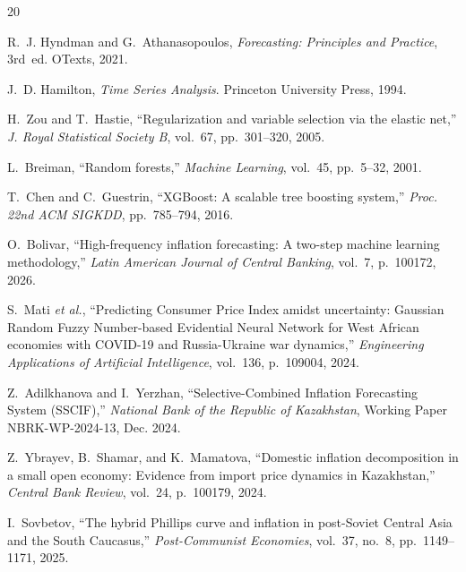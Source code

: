 \documentclass[14pt, a4paper]{extarticle}
\begin{document}
\newpage
\renewcommand{\refname}{REFERENCES}
\begin{thebibliography}{20}

R.~J. Hyndman and G.~Athanasopoulos,
\textit{Forecasting: Principles and Practice}, 3rd~ed.
OTexts, 2021.

J.~D. Hamilton,
\textit{Time Series Analysis}.
Princeton University Press, 1994.

H.~Zou and T.~Hastie,
``Regularization and variable selection via the elastic net,''
\textit{J. Royal Statistical Society B}, vol.~67, pp.~301--320, 2005.

L.~Breiman,
``Random forests,''
\textit{Machine Learning}, vol.~45, pp.~5--32, 2001.

T.~Chen and C.~Guestrin,
``XGBoost: A scalable tree boosting system,''
\textit{Proc. 22nd ACM SIGKDD}, pp.~785--794, 2016.

O.~Bolivar,
``High-frequency inflation forecasting: A two-step machine learning methodology,''
\textit{Latin American Journal of Central Banking}, vol.~7, p.~100172, 2026.

S.~Mati \textit{et al.},
``Predicting Consumer Price Index amidst uncertainty: Gaussian Random Fuzzy Number-based Evidential Neural Network for West African economies with COVID-19 and Russia-Ukraine war dynamics,''
\textit{Engineering Applications of Artificial Intelligence}, vol.~136, p.~109004, 2024.

Z.~Adilkhanova and I.~Yerzhan,
``Selective-Combined Inflation Forecasting System (SSCIF),''
\textit{National Bank of the Republic of Kazakhstan}, Working Paper NBRK-WP-2024-13, Dec. 2024.

Z.~Ybrayev, B.~Shamar, and K.~Mamatova,
``Domestic inflation decomposition in a small open economy: Evidence from import price dynamics in Kazakhstan,''
\textit{Central Bank Review}, vol.~24, p.~100179, 2024.

I.~Sovbetov,
``The hybrid Phillips curve and inflation in post-Soviet Central Asia and the South Caucasus,''
\textit{Post-Communist Economies}, vol.~37, no.~8, pp.~1149--1171, 2025.

\end{thebibliography}
\end{document}
